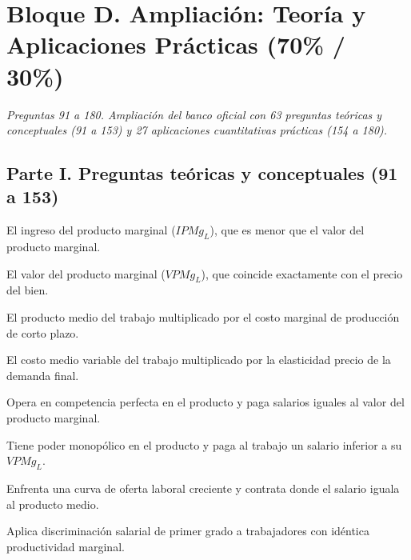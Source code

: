 \section*{Bloque D. Ampliación: Teoría y Aplicaciones Prácticas (70\% / 30\%)}

\noindent\textit{Preguntas 91 a 180. Ampliación del banco oficial con 63 preguntas teóricas y conceptuales (91 a 153) y 27 aplicaciones cuantitativas prácticas (154 a 180).}

\subsection*{Parte I. Preguntas teóricas y conceptuales (91 a 153)}

\begin{opts}
    \item El ingreso del producto marginal ($IPMg_L$), que es menor que el valor del producto marginal.
    \item El valor del producto marginal ($VPMg_L$), que coincide exactamente con el precio del bien.
    \item El producto medio del trabajo multiplicado por el costo marginal de producción de corto plazo.
    \item El costo medio variable del trabajo multiplicado por la elasticidad precio de la demanda final.
\end{opts}

\begin{opts}
    \item Opera en competencia perfecta en el producto y paga salarios iguales al valor del producto marginal.
    \item Tiene poder monopólico en el producto y paga al trabajo un salario inferior a su $VPMg_L$.
    \item Enfrenta una curva de oferta laboral creciente y contrata donde el salario iguala al producto medio.
    \item Aplica discriminación salarial de primer grado a trabajadores con idéntica productividad marginal.
\end{opts}

